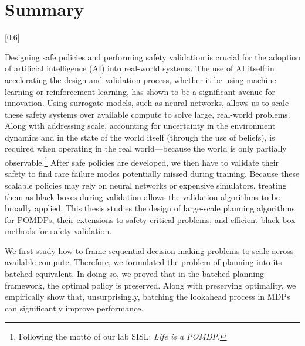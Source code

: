 \chapter{Summary}\label{ch:summary}
[0.6\linewidth]

Designing safe policies and performing safety validation is crucial for the adoption of artificial intelligence (AI) into real-world systems.
The use of AI itself in accelerating the design and validation process, whether it be using machine learning or reinforcement learning, has shown to be a significant avenue for innovation.
Using surrogate models, such as neural networks, allows us to scale these safety systems over available compute to solve large, real-world problems.
Along with addressing scale, accounting for uncertainty in the environment dynamics and in the state of the world itself (through the use of beliefs), is required when operating in the real world---because the world is only partially observable.\footnote{Following the motto of our lab SISL: \textit{Life is a POMDP}.}
After safe policies are developed, we then have to validate their safety to find rare failure modes potentially missed during training.
Because these scalable policies may rely on neural networks or expensive simulators, treating them as black boxes during validation allows the validation algorithms to be broadly applied.
This thesis studies the design of large-scale planning algorithms for POMDPs, their extensions to safety-critical problems, and efficient black-box methods for safety validation.


We first study how to frame sequential decision making problems to scale across available compute.
Therefore, we formulated the problem of planning into its batched equivalent.
In doing so, we proved that in the batched planning framework, the optimal policy is preserved.
Along with preserving optimality, we empirically show that, unsurprisingly, batching the lookahead process in MDPs can significantly improve performance.


